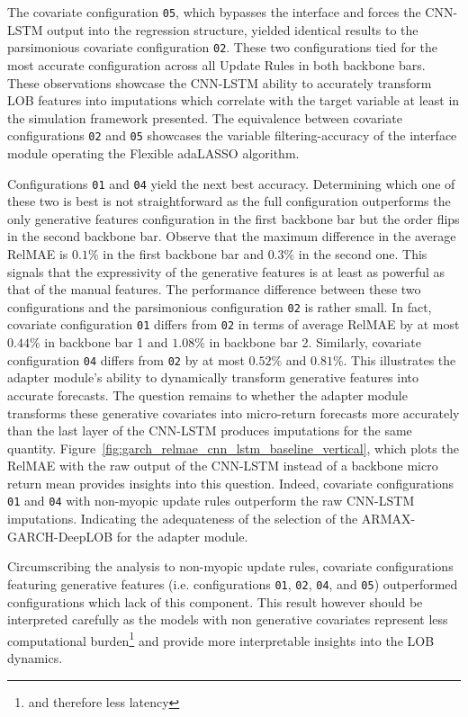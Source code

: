\documentclass[10pt,a4paper,oneside]{article}
\begin{document}
The covariate configuration \verb|05|, which bypasses the interface and forces the CNN-LSTM output into the regression structure, yielded identical results to the parsimonious covariate configuration \verb|02|. These two configurations tied for the most accurate configuration across all Update Rules in both backbone bars. These observations showcase the CNN-LSTM ability to accurately transform LOB features into imputations which correlate with the target variable at least in the simulation framework presented. The equivalence between covariate configurations \verb|02| and \verb|05| showcases the variable filtering-accuracy of the interface module operating the Flexible adaLASSO algorithm.

Configurations \verb|01| and \verb|04| yield the next best accuracy. Determining which one of these two is best is not straightforward as the full configuration outperforms the only generative features configuration in the first backbone bar but the order flips in the second backbone bar. Observe that the maximum difference in the average RelMAE is $0.1\%$ in the first backbone bar and $0.3\%$ in the second one. This signals that the expressivity of the generative features is at least as powerful as that of the manual features. The performance difference between these two configurations and the parsimonious configuration \verb|02| is rather small. In fact, covariate configuration \verb|01| differs from \verb|02| in terms of average RelMAE by at most $0.44\%$ in backbone bar 1 and $1.08\%$ in backbone bar 2. Similarly, covariate configuration \verb|04| differs from \verb|02| by at most $0.52\%$ and $0.81\%$. This illustrates the adapter module's ability to dynamically transform generative features into accurate forecasts. The question remains to whether the adapter module transforms these generative covariates into micro-return forecasts more accurately than the last layer of the CNN-LSTM produces imputations for the same quantity. Figure~\ref{fig:garch_relmae_cnn_lstm_baseline_vertical}, which plots the RelMAE with the raw output of the CNN-LSTM instead of a backbone micro return mean provides insights into this question. Indeed, covariate configurations \verb|01| and \verb|04| with non-myopic update rules outperform the raw CNN-LSTM imputations. Indicating the adequateness of the selection of the ARMAX-GARCH-DeepLOB for the adapter module.

Circumscribing the analysis to non-myopic update rules, covariate configurations featuring generative features (i.e. configurations \verb|01|, \verb|02|, \verb|04|, and \verb|05|) outperformed configurations which lack of this component. This result however should be interpreted carefully as the models with non generative covariates represent less computational burden\footnote{and therefore less latency} and provide more interpretable insights into the LOB dynamics.
\end{document}

